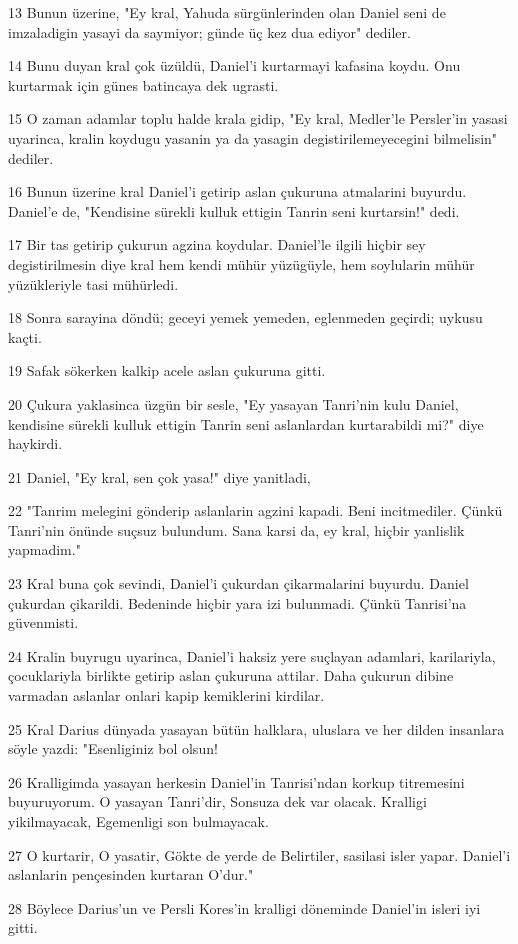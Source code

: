\par 13 Bunun üzerine, "Ey kral, Yahuda sürgünlerinden olan Daniel seni de imzaladigin yasayi da saymiyor; günde üç kez dua ediyor" dediler.
\par 14 Bunu duyan kral çok üzüldü, Daniel'i kurtarmayi kafasina koydu. Onu kurtarmak için günes batincaya dek ugrasti.
\par 15 O zaman adamlar toplu halde krala gidip, "Ey kral, Medler'le Persler'in yasasi uyarinca, kralin koydugu yasanin ya da yasagin degistirilemeyecegini bilmelisin" dediler.
\par 16 Bunun üzerine kral Daniel'i getirip aslan çukuruna atmalarini buyurdu. Daniel'e de, "Kendisine sürekli kulluk ettigin Tanrin seni kurtarsin!" dedi.
\par 17 Bir tas getirip çukurun agzina koydular. Daniel'le ilgili hiçbir sey degistirilmesin diye kral hem kendi mühür yüzügüyle, hem soylularin mühür yüzükleriyle tasi mühürledi.
\par 18 Sonra sarayina döndü; geceyi yemek yemeden, eglenmeden geçirdi; uykusu kaçti.
\par 19 Safak sökerken kalkip acele aslan çukuruna gitti.
\par 20 Çukura yaklasinca üzgün bir sesle, "Ey yasayan Tanri'nin kulu Daniel, kendisine sürekli kulluk ettigin Tanrin seni aslanlardan kurtarabildi mi?" diye haykirdi.
\par 21 Daniel, "Ey kral, sen çok yasa!" diye yanitladi,
\par 22 "Tanrim melegini gönderip aslanlarin agzini kapadi. Beni incitmediler. Çünkü Tanri'nin önünde suçsuz bulundum. Sana karsi da, ey kral, hiçbir yanlislik yapmadim."
\par 23 Kral buna çok sevindi, Daniel'i çukurdan çikarmalarini buyurdu. Daniel çukurdan çikarildi. Bedeninde hiçbir yara izi bulunmadi. Çünkü Tanrisi'na güvenmisti.
\par 24 Kralin buyrugu uyarinca, Daniel'i haksiz yere suçlayan adamlari, karilariyla, çocuklariyla birlikte getirip aslan çukuruna attilar. Daha çukurun dibine varmadan aslanlar onlari kapip kemiklerini kirdilar.
\par 25 Kral Darius dünyada yasayan bütün halklara, uluslara ve her dilden insanlara söyle yazdi: "Esenliginiz bol olsun!
\par 26 Kralligimda yasayan herkesin Daniel'in Tanrisi'ndan korkup titremesini buyuruyorum. O yasayan Tanri'dir, Sonsuza dek var olacak. Kralligi yikilmayacak, Egemenligi son bulmayacak.
\par 27 O kurtarir, O yasatir, Gökte de yerde de Belirtiler, sasilasi isler yapar. Daniel'i aslanlarin pençesinden kurtaran O'dur."
\par 28 Böylece Darius'un ve Persli Kores'in kralligi döneminde Daniel'in isleri iyi gitti.

